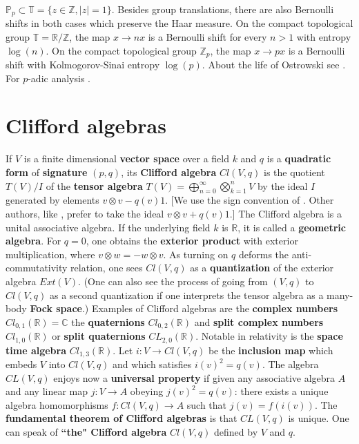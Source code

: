 \documentclass[12pt]{amsart}
\begin{document}
$\mathbb{P}_p \subset \mathbb{T}= \{ z \in \mathbb{Z}, |z|=1 \}$.
Besides group translations, there are also Bernoulli shifts in both cases which preserve the Haar measure.
On the compact topological group $\mathbb{T}=\mathbb{R}/\mathbb{Z}$,
the map $x \to n x$ is a Bernoulli shift for every $n >1$ with entropy $\log(n)$.
On the compact topological group $\mathbb{Z}_p$, the map $x \to p x$ is a Bernoulli shift with 
Kolmogorov-Sinai entropy $\log(p)$.
About the life of Ostrowski see \cite{GautschiOstrowski}. For $p$-adic analysis \cite{KatokPAdic2007,Gouvea1997}.

\section{Clifford algebras}

If $V$ is a finite dimensional {\bf vector space} over a field $k$ and $q$ is a {\bf quadratic form}
of {\bf signature} $(p,q)$, its {\bf Clifford algebra}
$Cl(V,q)$ is the quotient $T(V)/I$ of the {\bf tensor algebra} $T(V) = \bigoplus_{n=0}^{\infty} \bigotimes_{k=1}^n V$ by the ideal
$I$ generated by elements $v \otimes v - q(v) 1$.
[We use the sign convention of \cite{Chevalley1995, Snygg1997}. Other authors, 
like \cite{Garling2011,LawsonMichelsohn},
prefer to take the ideal $v \otimes v + q(v) 1$.] 
The Clifford algebra is a unital associative algebra. If the underlying field $k$ is $\mathbb{R}$, it is called
a {\bf geometric algebra}.
For $q=0$, one obtains the {\bf exterior product} with exterior multiplication, where $v \otimes w=-w \otimes v$.
As turning on $q$ deforms the anti-commutativity relation, one sees $Cl(V,q)$ as a {\bf quantization} of
the exterior algebra $Ext(V)$. (One can also see the process of going from $(V,q)$ to $Cl(V,q)$ as a second quantization
if one interprets the tensor algebra as a many-body {\bf Fock space}.)
Examples of Clifford algebras are the {\bf complex numbers} $Cl_{0,1}(\mathbb{R}) = \mathbb{C}$
the {\bf quaternions} $Cl_{0,2}(\mathbb{R})$ and {\bf split complex numbers} $Cl_{1,0}(\mathbb{R})$
or {\bf split quaternions} $CL_{2,0}(\mathbb{R})$. Notable in relativity is the {\bf space time algebra}
$Cl_{1,3}(\mathbb{R})$. Let $i: V \to Cl(V,q)$ be the {\bf inclusion map} which embeds $V$ into $Cl(V,q)$ and which
satisfies $i(v)^2 = q(v)$. The algebra $CL(V,q)$ enjoys now a {\bf universal property}
if given any associative algebra $A$ and any linear map $j:V \to A$
obeying $j(v)^2=q(v)$: there exists a unique algebra homomorphisms $f: Cl(V,q) \to A$
such that $j(v) = f(i(v))$. The {\bf fundamental theorem of Clifford algebras} is that
$CL(V,q)$ is unique. One can speak of {\bf ``the" Clifford algebra} $Cl(V,q)$ defined by $V$ and $q$.
\end{document}
